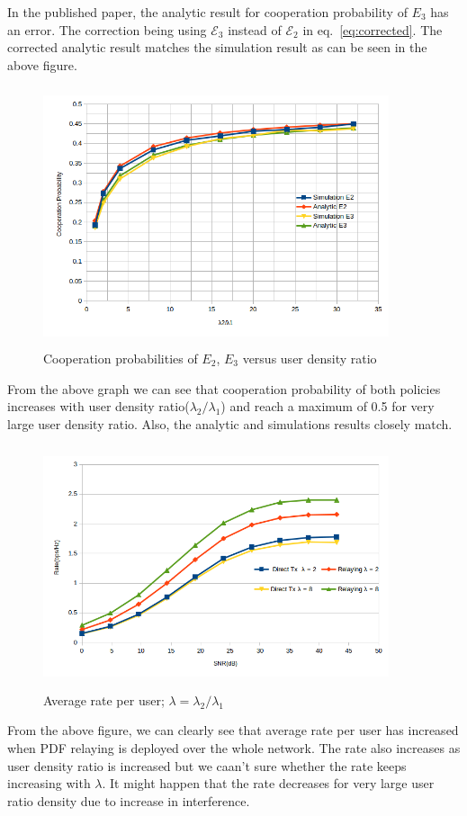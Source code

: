 In the published paper, the analytic result for cooperation probability of $E_3$ has an error. The correction being using $\mathcal{E}_3$ instead of $\mathcal{E}_2$ in eq.~\ref{eq:corrected}. The corrected analytic result matches the simulation result as can be seen in the above figure. 
\begin{figure}[H]
\begin{center}
\includegraphics[height = 3in,width=4in,angle=00]{images/coopP.png}
\caption{\small Cooperation probabilities of $E_2$, $E_3$ versus user density ratio}
\label{fig:cooP}
\end{center}
\end{figure}
From the above graph we can see that cooperation probability of both policies increases with user density ratio($\lambda_2/\lambda_1$) and reach a maximum of 0.5 for very large user density ratio. Also, the analytic and simulations results closely match. 

\begin{figure}[H]
\begin{center}
\includegraphics[height = 2.8in,width=4in,angle=00]{images/rates.png}
\caption{\small Average rate per user; $\lambda = \lambda_2/\lambda_1$}
\label{fig:rates}
\end{center}
\end{figure}
From the above figure, we can clearly see that average rate per user has increased when PDF relaying is deployed over the whole network. The rate also increases as user density ratio is increased but we caan't sure whether the rate keeps increasing with $\lambda$. It might happen that the rate decreases for very large user ratio density due to increase in interference.

